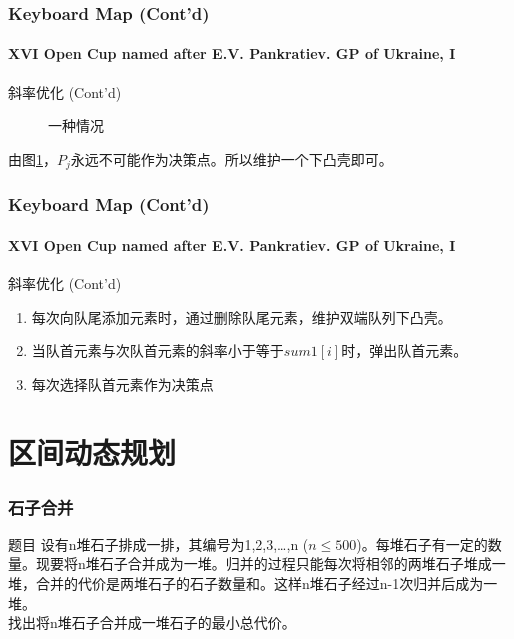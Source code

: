 \documentclass[hyperref={unicode=true}]{beamer}
\theoremstyle{definition}
\theoremstyle{proof}
\begin{document}
\begin{frame}\frametitle{Keyboard Map (Cont'd)}
  \framesubtitle{XVI Open Cup named after E.V. Pankratiev. GP of Ukraine, I}
  \begin{exampleblock}{斜率优化 (Cont'd)}
    \begin{figure}
      \caption{一种情况}\label{fig:line2}
    \end{figure}
    由图\ref{fig:line2}，$P_j$永远不可能作为决策点。所以维护一个下凸壳即可。
  \end{exampleblock}
\end{frame}
\begin{frame}\frametitle{Keyboard Map (Cont'd)}
  \framesubtitle{XVI Open Cup named after E.V. Pankratiev. GP of Ukraine, I}
  \begin{exampleblock}{斜率优化 (Cont'd)}
    \begin{enumerate}
    \item 每次向队尾添加元素时，通过删除队尾元素，维护双端队列下凸壳。
    \item 当队首元素与次队首元素的斜率小于等于$sum1[i]$时，弹出队首元素。
    \item 每次选择队首元素作为决策点
    \end{enumerate}
  \end{exampleblock}
\end{frame}

\section{区间动态规划}
\begin{frame}\frametitle{石子合并}
  \begin{block}{题目}
    设有n堆石子排成一排，其编号为1,2,3,…,n ($n\leq500$)。每堆石子有一定的数量。现要将n堆石子合并成为一堆。归并的过程只能每次将相邻的两堆石子堆成一堆，合并的代价是两堆石子的石子数量和。这样n堆石子经过n-1次归并后成为一堆。\\
    找出将n堆石子合并成一堆石子的最小总代价。
  \end{block}
\end{frame}
\end{document}
